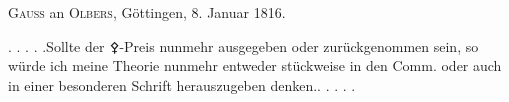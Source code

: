 \par{}\bigskip
\begin{center}
\textsc{Gauss} an \textsc{Olbers}, Göttingen, 8. Januar 1816.
\end{center}
\noindent\hspace*{\parindent}. . . . .\quad Sollte der {\AstroSymbols ⚴}-Preis nunmehr ausgegeben oder zurückgenommen sein, so würde ich meine Theorie nunmehr entweder stückweise in den Comm. oder auch in einer besonderen Schrift herauszugeben denken.\quad . . . . .
\par
